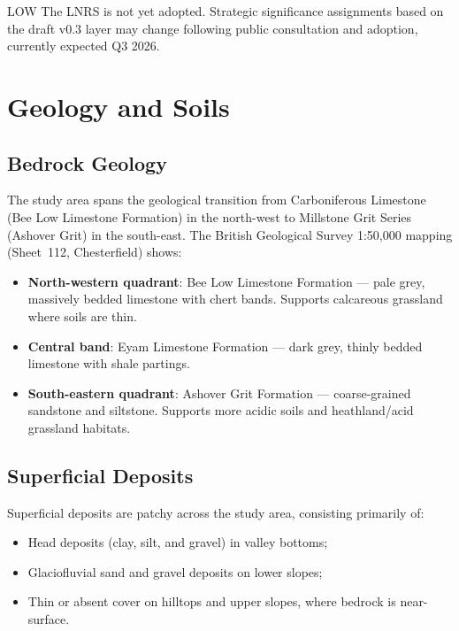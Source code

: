 \begin{confidencebox}{LOW}
The LNRS is not yet adopted. Strategic significance assignments based on the draft v0.3 layer may change following public consultation and adoption, currently expected Q3 2026.
\end{confidencebox}


\section{Geology and Soils}

\subsection{Bedrock Geology}

The study area spans the geological transition from Carboniferous Limestone (Bee Low Limestone Formation) in the north-west to Millstone Grit Series (Ashover Grit) in the south-east. The British Geological Survey 1:50,000 mapping (Sheet~112, Chesterfield) shows:

\begin{itemize}[nosep]
  \item \textbf{North-western quadrant}: Bee Low Limestone Formation — pale grey, massively bedded limestone with chert bands. Supports calcareous grassland where soils are thin.
  \item \textbf{Central band}: Eyam Limestone Formation — dark grey, thinly bedded limestone with shale partings.
  \item \textbf{South-eastern quadrant}: Ashover Grit Formation — coarse-grained sandstone and siltstone. Supports more acidic soils and heathland/acid grassland habitats.
\end{itemize}

\subsection{Superficial Deposits}

Superficial deposits are patchy across the study area, consisting primarily of:
\begin{itemize}[nosep]
  \item Head deposits (clay, silt, and gravel) in valley bottoms;
  \item Glaciofluvial sand and gravel deposits on lower slopes;
  \item Thin or absent cover on hilltops and upper slopes, where bedrock is near-surface.
\end{itemize}


